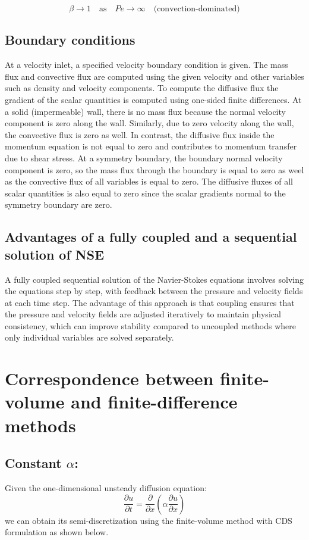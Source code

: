 \documentclass{article}
\begin{document}
\[
\beta \to 1 \quad \text{as} \quad Pe \to \infty \quad \text{(convection-dominated)}
\]

\subsection{Boundary conditions}

At a velocity inlet, a specified velocity boundary condition is given. The mass flux and convective flux are computed using the given velocity 
and other variables such as density and velocity components. To compute the diffusive flux the gradient of the scalar quantities is computed using
one-sided finite differences. At a solid (impermeable) wall, there is no mass flux because the normal velocity component is zero along the wall. 
Similarly, due to zero velocity along the wall, the convective flux is zero as well. In contrast, the diffusive flux inside the momentum equation 
is not equal to zero and contributes to momentum transfer due to shear stress. At a symmetry boundary, the boundary normal velocity component is zero,
so the mass flux through the boundary is equal to zero as weel as the convective flux of all variables is equal to zero. The diffusive fluxes
of all scalar quantities is also equal to zero since the scalar gradients normal to the symmetry boundary are zero.

\subsection{Advantages of a fully coupled and a sequential solution of NSE}

A fully coupled sequential solution of the Navier-Stokes equations involves solving the equations step by step, with feedback between the 
pressure and velocity fields at each time step. The advantage of this approach is that coupling ensures that the pressure and velocity fields
are adjusted iteratively to maintain physical consistency, which can improve stability compared to uncoupled methods where only individual 
variables are solved separately.

\section{Correspondence between finite-volume and finite-difference methods}

\subsection{Constant $\alpha$:}
Given the one-dimensional unsteady diffusion equation:
\begin{equation}
  \frac{\partial u}{\partial t} = \frac{\partial}{\partial x} \left( \alpha \frac{\partial u}{\partial x} \right)
\end{equation}
we can obtain its semi-discretization using the finite-volume method with CDS formulation as shown below.
\end{document}
